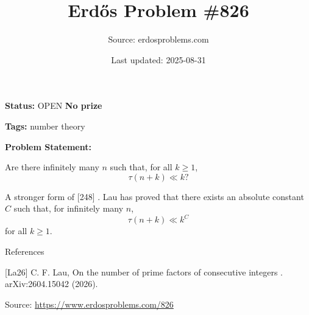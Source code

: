 \documentclass{article}
\title{Erd\H{o}s Problem \#826}
\date{Last updated: 2025-08-31}
\author{Source: erdosproblems.com}
\begin{document}
\maketitle

\noindent\textbf{Status:} OPEN \quad \textbf{No prize}

\noindent\textbf{Tags:} number theory

\medskip

\noindent\textbf{Problem Statement:}

Are there infinitely many $n$ such that, for all $k\geq 1$,\[\tau(n+k)\ll k?\]




A stronger form of [248] . Lau \cite{La26} has proved that there exists an absolute constant $C$ such that, for infinitely many $n$,\[\tau(n+k) \ll k^C\]for all $k\geq 1$.




References

[La26] C. F. Lau, On the number of prime factors of consecutive integers . arXiv:2604.15042 (2026).


\bigskip
\noindent\small{Source: \url{https://www.erdosproblems.com/826}}
\end{document}
